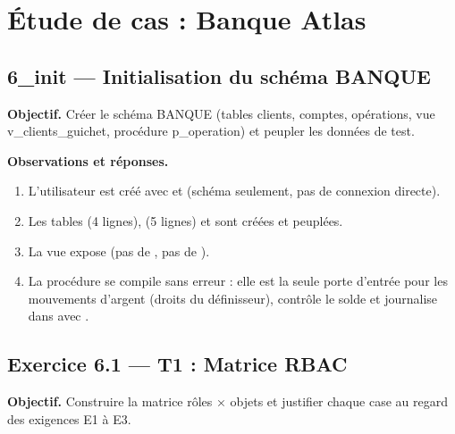 \section{Étude de cas : Banque Atlas}

\subsection{6\_init — Initialisation du schéma BANQUE}
\textbf{Objectif.} Créer le schéma BANQUE (tables clients, comptes, opérations, vue v\_clients\_guichet,
procédure p\_operation) et peupler les données de test.


\textbf{Observations et réponses.}
\begin{enumerate}
  \item L'utilisateur  est créé avec  et
         (schéma seulement, pas de connexion directe).
  \item Les tables  (4 lignes),  (5 lignes) et
         sont créées et peuplées.
  \item La vue  expose 
        (pas de , pas de ).
  \item La procédure  se compile sans erreur : elle est la seule porte
        d'entrée pour les mouvements d'argent (droits du définisseur), contrôle le solde et
        journalise dans  avec .
\end{enumerate}

\subsection{Exercice 6.1 — T1 : Matrice RBAC}
\textbf{Objectif.} Construire la matrice rôles × objets et justifier chaque case au regard des
exigences E1 à E3.

